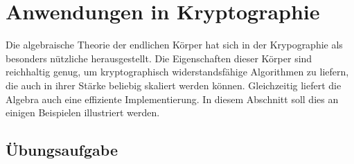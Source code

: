 %
%
%
\chapter{Anwendungen in Kryptographie
\label{buch:chapter:kryptographie}}
\rhead{}
Die algebraische Theorie der endlichen Körper hat sich
in der Krypographie als besonders nützliche herausgestellt.
Die Eigenschaften dieser Körper sind reichhaltig genug, um 
kryptographisch widerstandsfähige Algorithmen zu liefern, die
auch in ihrer Stärke beliebig skaliert werden können.
Gleichzeitig liefert die Algebra auch eine effiziente Implementierung.
In diesem Abschnitt soll dies an einigen Beispielen illustriert werden.





%

\section*{Übungsaufgabe}
\begin{uebungsaufgaben}
\end{uebungsaufgaben}

